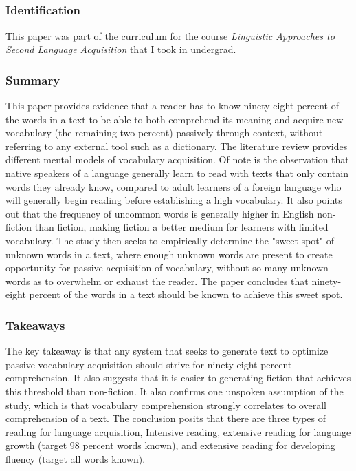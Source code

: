 \documentclass[
	letterpaper, %
]{jdf}
\begin{document}
\subsection{}
\subsubsection{Identification}
This paper was part of the curriculum for the course \textit{Linguistic Approaches to Second Language Acquisition} that I took in undergrad.

\subsubsection{Summary}
This paper provides evidence that a reader has to know ninety-eight percent of the words in a text to be able to both comprehend its meaning and acquire new vocabulary (the remaining two percent) passively through context, without referring to any external tool such as a dictionary. The literature review provides different mental models of vocabulary acquisition. Of note is the observation that native speakers of a language generally learn to read with texts that only contain words they already know, compared to adult learners of a foreign language who will generally begin reading before establishing a high vocabulary. It also points out that the frequency of uncommon words is generally higher in English non-fiction than fiction, making fiction a better medium for learners with limited vocabulary. The study then seeks to empirically determine the "sweet spot" of unknown words in a text, where enough unknown words are present to create opportunity for passive acquisition of vocabulary, without so many unknown words as to overwhelm or exhaust the reader. The paper concludes that ninety-eight percent of the words in a text should be known to achieve this sweet spot.

\subsubsection{Takeaways}
The key takeaway is that any system that seeks to generate text to optimize passive vocabulary acquisition should strive for ninety-eight percent comprehension. It also suggests that it is easier to generating fiction that achieves this threshold than non-fiction. It also confirms one unspoken assumption of the study, which is that vocabulary comprehension strongly correlates to overall comprehension of a text. The conclusion posits that there are three types of reading for language acquisition, Intensive reading, extensive reading for language growth (target 98 percent words known), and extensive reading for developing fluency (target all words known).
%
\end{document}
